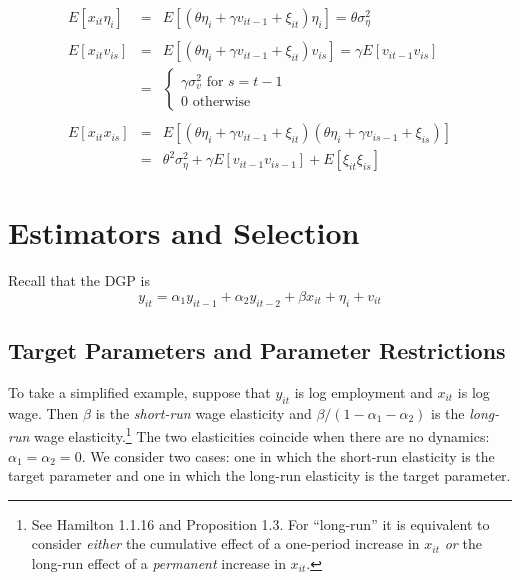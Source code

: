 \documentclass[12pt]{article}
\begin{document}
\begin{eqnarray*}
E[x_{it}\eta_i] &=& E[(\theta \eta_i + \gamma v_{it-1} + \xi_{it})\eta_i] =  \theta \sigma_\eta^2\\ \\
  E[x_{it}v_{is}] &=& E[(\theta \eta_i + \gamma v_{it-1} + \xi_{it})v_{is}] = \gamma E[v_{it-1}v_{is}]\\
    &=& \left\{\begin{array}{l}\gamma \sigma_v^2 \mbox{ for } s=t-1 \\0 \mbox{ otherwise} \end{array} \right.\\ \\
  E[x_{it}x_{is}] &=& E[(\theta \eta_i + \gamma v_{it-1} + \xi_{it})(\theta \eta_i + \gamma v_{is-1} + \xi_{is})]\\
    &=& \theta^2 \sigma_\eta^2 +\gamma E[v_{it-1}v_{is-1}] + E[\xi_{it}\xi_{is}]
\end{eqnarray*}



\section{Estimators and Selection}
Recall that the DGP is
  $$y_{it} = \alpha_1 y_{it-1} + \alpha_2 y_{it-2} + \beta x_{it} + \eta_i +  v_{it}$$

\subsection{Target Parameters and Parameter Restrictions}
To take a simplified example, suppose that $y_{it}$ is log employment and $x_{it}$ is log wage. Then $\beta$ is the \emph{short-run} wage elasticity and $\beta/(1 - \alpha_1 - \alpha_2)$ is the \emph{long-run} wage elasticity.\footnote{See Hamilton 1.1.16 and Proposition 1.3. For ``long-run'' it is equivalent to consider \emph{either} the cumulative effect of a one-period increase in $x_{it}$ \emph{or} the long-run effect of a \emph{permanent} increase in $x_{it}$.} The two elasticities coincide when there are no dynamics: $\alpha_1 = \alpha_2 = 0$. We consider two cases: one in which the short-run elasticity is the target parameter and one in which the long-run elasticity is the target parameter. 

\end{document}

